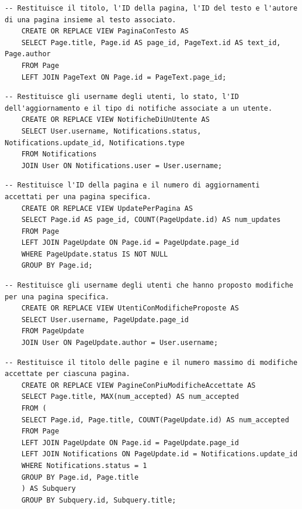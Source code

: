 \documentclass{article}
\begin{document}
\begin{lstlisting}[caption={Vista PaginaConTesto}, label={lst:pagina_con_testo}]
	-- Restituisce il titolo, l'ID della pagina, l'ID del testo e l'autore di una pagina insieme al testo associato.
	CREATE OR REPLACE VIEW PaginaConTesto AS
	SELECT Page.title, Page.id AS page_id, PageText.id AS text_id, Page.author
	FROM Page
	LEFT JOIN PageText ON Page.id = PageText.page_id;
\end{lstlisting}

\begin{lstlisting}[caption={Vista NotificheDiUnUtente}, label={lst:notifiche_di_un_utente}]
	-- Restituisce gli username degli utenti, lo stato, l'ID dell'aggiornamento e il tipo di notifiche associate a un utente.
	CREATE OR REPLACE VIEW NotificheDiUnUtente AS
	SELECT User.username, Notifications.status, Notifications.update_id, Notifications.type
	FROM Notifications
	JOIN User ON Notifications.user = User.username;
\end{lstlisting}

\begin{lstlisting}[caption={Vista UpdatePerPagina}, label={lst:update_per_pagina}]
	-- Restituisce l'ID della pagina e il numero di aggiornamenti accettati per una pagina specifica.
	CREATE OR REPLACE VIEW UpdatePerPagina AS
	SELECT Page.id AS page_id, COUNT(PageUpdate.id) AS num_updates
	FROM Page
	LEFT JOIN PageUpdate ON Page.id = PageUpdate.page_id
	WHERE PageUpdate.status IS NOT NULL
	GROUP BY Page.id;
\end{lstlisting}

\begin{lstlisting}[caption={Vista UtentiConModificheProposte}, label={lst:utenti_con_modifiche_proposte}]
	-- Restituisce gli username degli utenti che hanno proposto modifiche per una pagina specifica.
	CREATE OR REPLACE VIEW UtentiConModificheProposte AS
	SELECT User.username, PageUpdate.page_id
	FROM PageUpdate
	JOIN User ON PageUpdate.author = User.username;
\end{lstlisting}

\begin{lstlisting}[caption={Vista PagineConPiuModificheAccettate}, label={lst:pagine_con_piu_modifiche_accettate}]
	-- Restituisce il titolo delle pagine e il numero massimo di modifiche accettate per ciascuna pagina.
	CREATE OR REPLACE VIEW PagineConPiuModificheAccettate AS
	SELECT Page.title, MAX(num_accepted) AS num_accepted
	FROM (
	SELECT Page.id, Page.title, COUNT(PageUpdate.id) AS num_accepted
	FROM Page
	LEFT JOIN PageUpdate ON Page.id = PageUpdate.page_id
	LEFT JOIN Notifications ON PageUpdate.id = Notifications.update_id
	WHERE Notifications.status = 1
	GROUP BY Page.id, Page.title
	) AS Subquery
	GROUP BY Subquery.id, Subquery.title;
\end{lstlisting}
\end{document}

